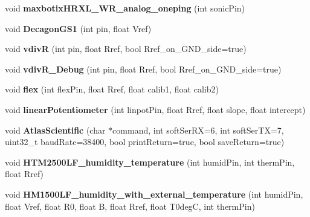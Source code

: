 \begin{DoxyCompactItemize}
\item 
void {\bfseries maxbotix\+H\+R\+X\+L\+\_\+\+W\+R\+\_\+analog\+\_\+oneping} (int sonic\+Pin)\hypertarget{classLogger_a889b3e76b0f8e21f9a8cc67b35169fdf}{}\label{classLogger_a889b3e76b0f8e21f9a8cc67b35169fdf}

\item 
void {\bfseries Decagon\+G\+S1} (int pin, float Vref)\hypertarget{classLogger_aefe17c5e9cf9b1581c36812d5a87fac1}{}\label{classLogger_aefe17c5e9cf9b1581c36812d5a87fac1}

\item 
void {\bfseries vdivR} (int pin, float Rref, bool Rref\+\_\+on\+\_\+\+G\+N\+D\+\_\+side=true)\hypertarget{classLogger_a1204f15e95e4119774c616807e9736bf}{}\label{classLogger_a1204f15e95e4119774c616807e9736bf}

\item 
void {\bfseries vdiv\+R\+\_\+\+Debug} (int pin, float Rref, bool Rref\+\_\+on\+\_\+\+G\+N\+D\+\_\+side=true)\hypertarget{classLogger_a8d318b089ca5fc2c3079f17c8495527a}{}\label{classLogger_a8d318b089ca5fc2c3079f17c8495527a}

\item 
void {\bfseries flex} (int flex\+Pin, float Rref, float calib1, float calib2)\hypertarget{classLogger_a75a7e7b6833aac586436198173137ad5}{}\label{classLogger_a75a7e7b6833aac586436198173137ad5}

\item 
void {\bfseries linear\+Potentiometer} (int linpot\+Pin, float Rref, float slope, float intercept)\hypertarget{classLogger_a7bd8c5c0c3240c8624ab71784ee1ef35}{}\label{classLogger_a7bd8c5c0c3240c8624ab71784ee1ef35}

\item 
void {\bfseries Atlas\+Scientific} (char $\ast$command, int soft\+Ser\+RX=6, int soft\+Ser\+TX=7, uint32\+\_\+t baud\+Rate=38400, bool print\+Return=true, bool save\+Return=true)\hypertarget{classLogger_a9fdcbb56e3e4910ac895ee150fe1b9ed}{}\label{classLogger_a9fdcbb56e3e4910ac895ee150fe1b9ed}

\item 
void {\bfseries H\+T\+M2500\+L\+F\+\_\+humidity\+\_\+temperature} (int humid\+Pin, int therm\+Pin, float Rref)\hypertarget{classLogger_a796603ef13ff8264574c9ac181fca0a4}{}\label{classLogger_a796603ef13ff8264574c9ac181fca0a4}

\item 
void {\bfseries H\+M1500\+L\+F\+\_\+humidity\+\_\+with\+\_\+external\+\_\+temperature} (int humid\+Pin, float Vref, float R0, float B, float Rref, float T0degC, int therm\+Pin)\hypertarget{classLogger_abf1b1f04c10ec9622e83d23c7e71db62}{}\label{classLogger_abf1b1f04c10ec9622e83d23c7e71db62}


\end{DoxyCompactItemize}

